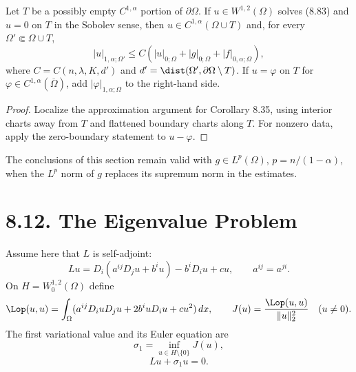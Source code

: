 \begin{corollary}
\label{gt-cor-8-36-partial-boundary-gradient-regularity}
Let $T$ be a possibly empty $C^{1,\alpha}$ portion of $\partial\Omega$. If
$u\in W^{1,2}(\Omega)$ solves (8.83) and $u=0$ on $T$ in the Sobolev sense,
then $u\in C^{1,\alpha}(\Omega\cup T)$ and, for every
$\Omega'\Subset\Omega\cup T$,
\begin{equation}
|u|_{1,\alpha;\Omega'}
\leq C(|u|_{0;\Omega}+|g|_{0;\Omega}+|f|_{0,\alpha;\Omega}),
\tag{8.91}
\end{equation}
where $C=C(n,\lambda,K,d')$ and
$d'=\dist(\Omega',\partial\Omega\setminus T)$. If $u=\varphi$ on $T$ for
$\varphi\in C^{1,\alpha}(\overline\Omega)$, add
$|\varphi|_{1,\alpha;\Omega}$ to the right-hand side.
\end{corollary}
\begin{proof}
\sketch Localize the approximation argument for Corollary 8.35, using interior
charts away from $T$ and flattened boundary charts along $T$. For nonzero data,
apply the zero-boundary statement to $u-\varphi$.
\end{proof}

\begin{remark}
\label{gt-rem-8-integrable-scalar-datum}
The conclusions of this section remain valid with
$g\in L^p(\Omega)$, $p=n/(1-\alpha)$, when the $L^p$ norm of $g$ replaces its
supremum norm in the estimates.
\end{remark}

\section*{8.12. The Eigenvalue Problem}

Assume here that $L$ is self-adjoint:
\[
Lu=D_i(a^{ij}D_ju+b^iu)-b^iD_iu+cu,
\qquad a^{ij}=a^{ji}.
\]
On $H=W_0^{1,2}(\Omega)$ define
\[
\Lop(u,u)=\int_\Omega(a^{ij}D_iuD_ju+2b^iuD_iu+cu^2)\,dx,
\qquad
J(u)=\frac{\Lop(u,u)}{\|u\|_2^2}\quad(u\neq0).
\]
The first variational value and its Euler equation are
\begin{equation}
\sigma_1=\inf_{u\in H\setminus\{0\}}J(u),
\tag{8.92}
\end{equation}
\begin{equation}
Lu+\sigma_1u=0.
\tag{8.93}
\end{equation}

